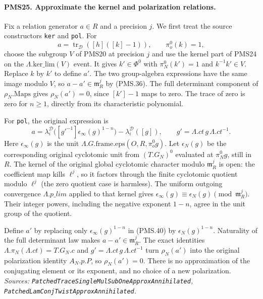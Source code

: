 \paragraph{PMS25. Approximate the kernel and polarization relations.}
\label{claim:PMS25}
Fix a relation generator $a\in R$ and a precision $j$.
We first treat the source constructors \texttt{ker} and \texttt{pol}.
For
\[
 a=\operatorname{tr}_{\mathcal D}([h]([k]-1)),
 \qquad \pi_o^0(k)=1,
\]
choose the subgroup $V$ of PMS20 at precision $j$ and use the
kernel part of PMS24 on the $\Lambda.\mathrm{ker\_lim}(V)$
event.  It gives $k'\in\Phi^0$ with
$\pi_N^0(k')=1$ and $k^{-1}k'\in V$.
Replace $k$ by $k'$ to define $a'$.
The two group-algebra expressions have the same image modulo
$V$, so $a-a'\in\mathfrak m_R^j$ by (PMS.36).
The full determinant component of $\rho_N.\mathrm{Maps}$
gives $\rho_N(a')=0$, since $[k']-1$ maps to zero.
The trace of zero is zero for $n\geq1$, directly from its
characteristic polynomial.

For \texttt{pol}, the original expression is
\[
 a=\lambda_i^{\mathcal D}
       \bigl([g'^{-1}]\epsilon_\infty(g)^{1-n}\bigr)
       -\lambda_i^{\mathcal D}([g]),\qquad
 g'=\Lambda.ct\,g\,\Lambda.ct^{-1}.              \tag{PMS.40}
\]
Here $\epsilon_\infty(g)$ is the unit
$\Lambda.G.\mathrm{frame.eps}(O,R,\pi_o^0g)$.
Let $\epsilon_N(g)$ be the corresponding original cyclotomic
unit from $(T.G_N)^0$ evaluated at $\pi_N^0g$, still in $R$.
The kernel of the original global cyclotomic character modulo
$\mathfrak m_R^j$ is open: the coefficient map kills
$\ell^j$, so it factors through the finite cyclotomic quotient
modulo $\ell^j$ (the zero quotient case is harmless).
The uniform outgoing convergence $\Lambda.p\_lim$ applied to
that kernel gives
$\epsilon_\infty(g)\equiv\epsilon_N(g)\pmod{\mathfrak m_R^j}$.
Their integer powers, including the negative exponent $1-n$,
agree in the unit group of the quotient.

Define $a'$ by replacing only $\epsilon_\infty(g)^{1-n}$ in
(PMS.40) by $\epsilon_N(g)^{1-n}$.
Naturality of the full determinant law makes
$a-a'\in\mathfrak m_R^j$.
The exact identities $\Lambda.\pi_N(\Lambda.ct)=T.G_N.c$
and $g'=\Lambda.ct\,g\,\Lambda.ct^{-1}$ turn
$\rho_N(a')$ into the original polarization identity
$A_N.p.P$, so $\rho_N(a')=0$.
There is no approximation of the conjugating element or its
exponent, and no choice of a new polarization.
\hfill\textit{Sources: \texttt{PatchedTraceSingleMulSubOneApproxAnnihilated},
\texttt{PatchedLamConjTwistApproxAnnihilated}.}

